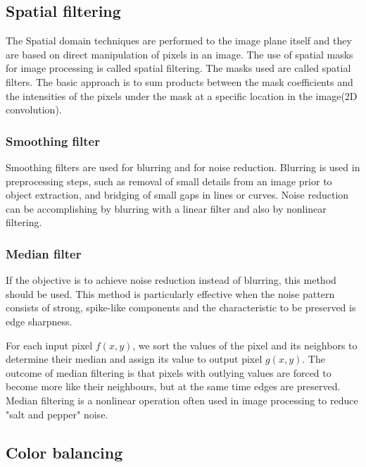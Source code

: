 \documentclass[conference]{IEEEtran}
\begin{document}

\subsection{Spatial filtering}
The Spatial domain techniques are performed to the image plane itself and they are based on direct manipulation of pixels in an image.
The use of spatial masks for image processing is called spatial filtering. The masks used are called spatial filters. The basic approach is to sum products between the mask coefficients and the intensities of the pixels under the mask at a specific location in the image(2D convolution).

\subsubsection{Smoothing filter}

Smoothing filters are used for blurring and for noise reduction. Blurring is used in preprocessing steps, such as removal of small details from an image prior to object extraction, and bridging of small gaps in lines or curves. Noise reduction can be accomplishing by blurring with a linear filter and also by nonlinear filtering.

\subsubsection{Median filter}
If the objective is to achieve noise reduction instead of blurring, this method should be used.
This method is particularly effective when the noise pattern consists of strong, spike-like components and the characteristic to be preserved is edge sharpness.  

 For each input pixel $f(x,y)$, we sort the values of the pixel and its neighbors to determine their median and assign its value to output pixel $g(x,y)$. The outcome of median filtering is that pixels with outlying values are forced to become more like their neighbours, but at the same time edges are preserved. Median filtering is a nonlinear operation often used in image processing to reduce "salt and pepper" noise.


\subsection{Color balancing}
\end{document}
